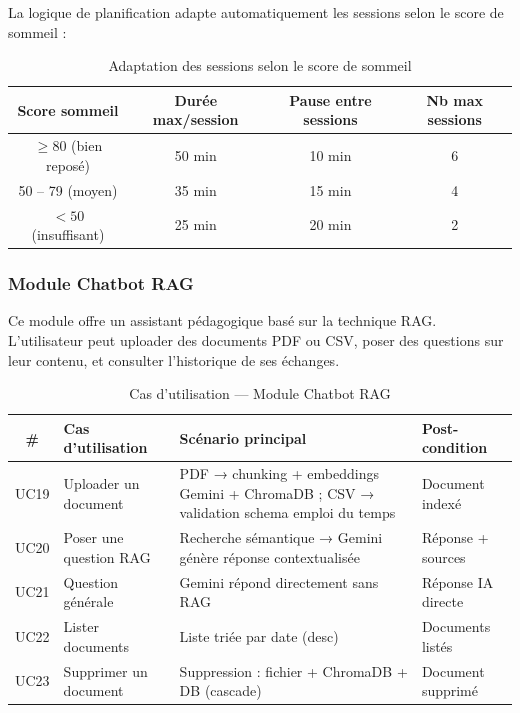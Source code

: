 \documentclass[12pt,a4paper]{report}
\begin{document}
La logique de planification adapte automatiquement les sessions selon le score de sommeil :

\vspace{0.5em}
\begin{table}[H]
    \centering
    \caption{Adaptation des sessions selon le score de sommeil}
    \label{tab:sleep_adaptation}
    \renewcommand{\arraystretch}{1.3}
    \begin{tabular}{|c|c|c|c|}
        \hline
        \textbf{Score sommeil} & \textbf{Durée max/session} & \textbf{Pause entre sessions} & \textbf{Nb max sessions} \\
        \hline
        $\geq 80$ (bien reposé) & 50 min & 10 min & 6 \\
        \hline
        50 – 79 (moyen) & 35 min & 15 min & 4 \\
        \hline
        $< 50$ (insuffisant) & 25 min & 20 min & 2 \\
        \hline
    \end{tabular}
\end{table}

\subsubsection{Module Chatbot RAG}

Ce module offre un assistant pédagogique basé sur la technique \ac{RAG}. L'utilisateur peut uploader des documents PDF ou CSV, poser des questions sur leur contenu, et consulter l'historique de ses échanges.

\begin{table}[H]
    \centering
    \caption{Cas d'utilisation — Module Chatbot RAG}
    \renewcommand{\arraystretch}{1.3}
    \begin{tabular}{|c|p{3.5cm}|p{4.5cm}|p{3.5cm}|}
        \hline
        \textbf{\#} & \textbf{Cas d'utilisation} & \textbf{Scénario principal} & \textbf{Post-condition} \\
        \hline
        UC19 & Uploader un document & PDF → chunking + embeddings Gemini + ChromaDB ; CSV → validation schema emploi du temps & Document indexé \\
        \hline
        UC20 & Poser une question RAG & Recherche sémantique → Gemini génère réponse contextualisée & Réponse + sources \\
        \hline
        UC21 & Question générale & Gemini répond directement sans RAG & Réponse IA directe \\
        \hline
        UC22 & Lister documents & Liste triée par date (desc) & Documents listés \\
        \hline
        UC23 & Supprimer un document & Suppression : fichier + ChromaDB + DB (cascade) & Document supprimé \\
        \hline
    \end{tabular}
\end{table}
\end{document}
